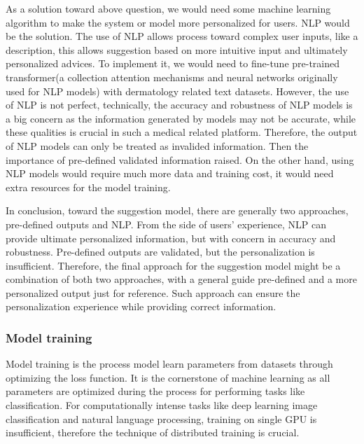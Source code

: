                    As a solution toward above question, we would need some machine learning algorithm to make the system or model more personalized for users. NLP would be the solution. The use of NLP allows process toward complex user inputs, like a description, this allows suggestion based on more intuitive input and ultimately personalized advices. To implement it, we would need to fine-tune pre-trained transformer(a collection attention mechanisms and neural networks originally used for NLP models) with dermatology related text datasets. However, the use of NLP is not perfect, technically, the accuracy and robustness of NLP models is a big concern as the information generated by models may not be accurate, while these qualities is crucial in such a medical related platform. Therefore, the output of NLP models can only be treated as invalided information. Then the importance of pre-defined validated information raised. On the other hand, using NLP models would require much more data and training cost, it would need extra resources for the model training.

                    In conclusion, toward the suggestion model, there are generally two approaches, pre-defined outputs and NLP. From the side of users' experience, NLP can provide ultimate personalized information, but with concern in accuracy and robustness. Pre-defined outputs are validated, but the personalization is insufficient. Therefore, the final approach for the suggestion model might be a combination of both two approaches, with a general guide pre-defined and a more personalized output just for reference. Such approach can ensure the personalization experience while providing correct information.
            \subsubsection{Model training}
                    Model training is the process model learn parameters from datasets through optimizing the loss function. It is the cornerstone of machine learning as all parameters are optimized during the process for performing tasks like classification. For computationally intense tasks like deep learning image classification and natural language processing, training on single GPU is insufficient, therefore the technique of distributed training is crucial.

